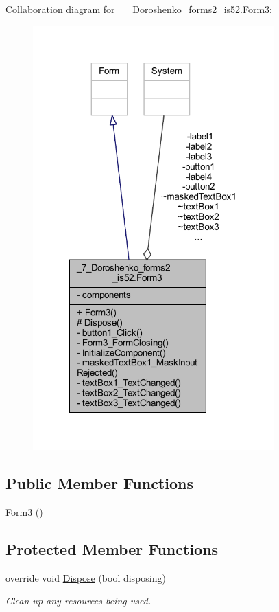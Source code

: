 Collaboration diagram for \+\_\+\_\+\+Doroshenko\+\_\+forms2\+\_\+is52.\+Form3\+:
\nopagebreak
\begin{figure}[H]
\begin{center}
\leavevmode
\includegraphics[width=263pt]{class__7___doroshenko__forms2__is52_1_1_form3__coll__graph}
\end{center}
\end{figure}
\subsection*{Public Member Functions}
\begin{DoxyCompactItemize}
\item 
\hyperlink{class__7___doroshenko__forms2__is52_1_1_form3_a21f3d82d83cd30ee58daa82b090e93d5}{Form3} ()
\end{DoxyCompactItemize}
\subsection*{Protected Member Functions}
\begin{DoxyCompactItemize}
\item 
override void \hyperlink{class__7___doroshenko__forms2__is52_1_1_form3_a84df79232699c339a7858409d4a5709c}{Dispose} (bool disposing)
\begin{DoxyCompactList}\small\item\em Clean up any resources being used. \end{DoxyCompactList}\end{DoxyCompactItemize}
